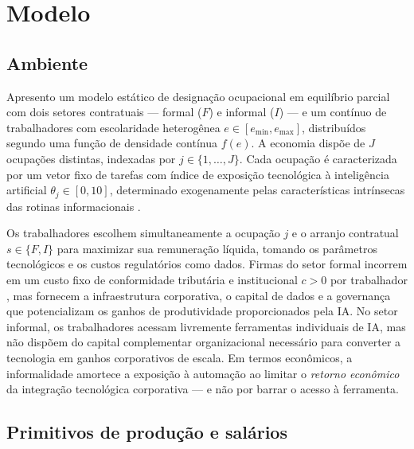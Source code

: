 \section{Modelo}
\label{sec:modelo}

\subsection{Ambiente}

Apresento um modelo estático de designação ocupacional em equilíbrio parcial com dois setores contratuais --- formal ($F$) e informal ($I$) --- e um contínuo de trabalhadores com escolaridade heterogênea $e \in [e_{\min}, e_{\max}]$, distribuídos segundo uma função de densidade contínua $f(e)$. A economia dispõe de $J$ ocupações distintas, indexadas por $j \in \{1, \dots, J\}$. Cada ocupação é caracterizada por um vetor fixo de tarefas com índice de exposição tecnológica à inteligência artificial $\theta_j \in [0, 10]$, determinado exogenamente pelas características intrínsecas das rotinas informacionais \citep{eloundou2024gpts}. 

Os trabalhadores escolhem simultaneamente a ocupação $j$ e o arranjo contratual $s \in \{F, I\}$ para maximizar sua remuneração líquida, tomando os parâmetros tecnológicos e os custos regulatórios como dados. Firmas do setor formal incorrem em um custo fixo de conformidade tributária e institucional $c > 0$ por trabalhador \citep{ulyssea2018firms}, mas fornecem a infraestrutura corporativa, o capital de dados e a governança que potencializam os ganhos de produtividade proporcionados pela IA. No setor informal, os trabalhadores acessam livremente ferramentas individuais de IA, mas não dispõem do capital complementar organizacional necessário para converter a tecnologia em ganhos corporativos de escala. Em termos econômicos, a informalidade amortece a exposição à automação ao limitar o \emph{retorno econômico} da integração tecnológica corporativa --- e não por barrar o acesso à ferramenta.

\subsection{Primitivos de produção e salários}

